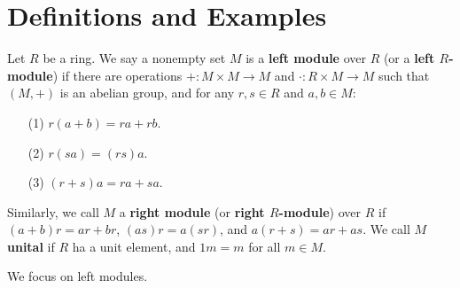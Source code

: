 
\section{Definitions and Examples}
\label{section1}

\begin{definition}
    Let $R$ be a ring. We say a nonempty set $M$ is a \textbf{left module} over $R$  (or a
    \textbf{left $R$-module}) if there are operations $+:M \times M \rightarrow M$ and $\cdot:R
    \times M \rightarrow M$ such that $(M,+)$ is an abelian group, and for any $r,s \in R$ and $a,b
    \in M$:
        \begin{enumerate}
            \item[(1)] $r(a+b)=ra+rb$.

            \item[(2)] $r(sa)=(rs)a$.

            \item[(3)] $(r+s)a=ra+sa$.
        \end{enumerate}
        Similarly, we call $M$ a \textbf{right module} (or \textbf{right $R$-module}) over $R$ if
        $(a+b)r=ar+br$, $(as)r=a(sr)$, and $a(r+s)=ar+as$.
    We call $M$  \textbf{unital} if $R$ ha a unit element, and  $1m=m$ for all  $m \in M$.
\end{definition}

We focus on left modules.

